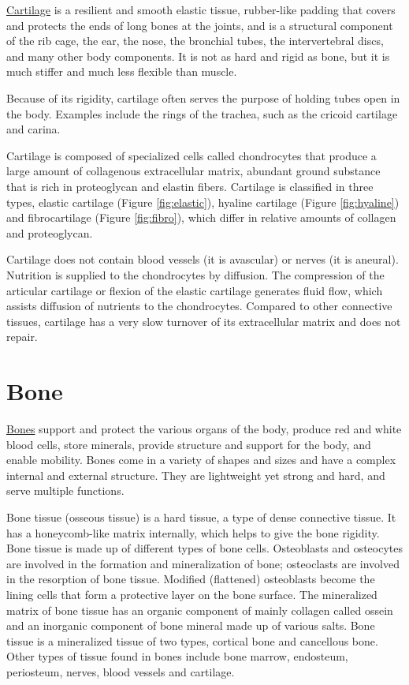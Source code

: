 \href{https://en.wikipedia.org/wiki/Cartilage}{Cartilage} is a resilient
and smooth elastic tissue, rubber-like padding that covers and protects
the ends of long bones at the joints, and is a structural component of
the rib cage, the ear, the nose, the bronchial tubes, the intervertebral
discs, and many other body components. It is not as hard and rigid as
bone, but it is much stiffer and much less flexible than muscle.

Because of its rigidity, cartilage often serves the purpose of holding
tubes open in the body. Examples include the rings of the trachea, such
as the cricoid cartilage and carina.

Cartilage is composed of specialized cells called chondrocytes that
produce a large amount of collagenous extracellular matrix, abundant
ground substance that is rich in proteoglycan and elastin fibers.
Cartilage is classified in three types, elastic cartilage (Figure
\ref{fig:elastic}), hyaline cartilage (Figure \ref{fig:hyaline}) and
fibrocartilage (Figure \ref{fig:fibro}), which differ in relative
amounts of collagen and proteoglycan.

Cartilage does not contain blood vessels (it is avascular) or nerves (it
is aneural). Nutrition is supplied to the chondrocytes by diffusion. The
compression of the articular cartilage or flexion of the elastic
cartilage generates fluid flow, which assists diffusion of nutrients to
the chondrocytes. Compared to other connective tissues, cartilage has a
very slow turnover of its extracellular matrix and does not repair.

\section{Bone}\label{bone}

\href{https://en.wikipedia.org/wiki/Bone}{Bones} support and protect the
various organs of the body, produce red and white blood cells, store
minerals, provide structure and support for the body, and enable
mobility. Bones come in a variety of shapes and sizes and have a complex
internal and external structure. They are lightweight yet strong and
hard, and serve multiple functions.

Bone tissue (osseous tissue) is a hard tissue, a type of dense
connective tissue. It has a honeycomb-like matrix internally, which
helps to give the bone rigidity. Bone tissue is made up of different
types of bone cells. Osteoblasts and osteocytes are involved in the
formation and mineralization of bone; osteoclasts are involved in the
resorption of bone tissue. Modified (flattened) osteoblasts become the
lining cells that form a protective layer on the bone surface. The
mineralized matrix of bone tissue has an organic component of mainly
collagen called ossein and an inorganic component of bone mineral made
up of various salts. Bone tissue is a mineralized tissue of two types,
cortical bone and cancellous bone. Other types of tissue found in bones
include bone marrow, endosteum, periosteum, nerves, blood vessels and
cartilage.

